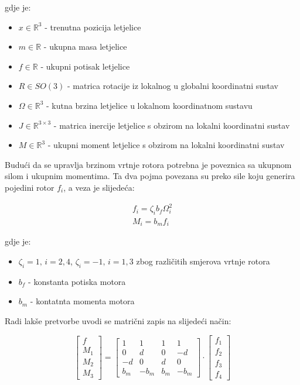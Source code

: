 \documentclass[times, utf8, diplomski]{fer}
\begin{document}
gdje je:
\begin{itemize}
	\item $x \in \mathbb{R}^3$ - trenutna pozicija letjelice
	
	\item $m \in \mathbb{R}$ - ukupna masa letjelice
	
	\item $f \in \mathbb{R}$ - ukupni potisak letjelice 
	
	\item $R \in SO(3)$ - matrica rotacije iz lokalnog u globalni koordinatni sustav
	
	\item $\Omega \in \mathbb{R}^3$ - kutna brzina letjelice u lokalnom koordinatnom sustavu
	
	\item $J \in \mathbb{R}^{3\times3}$ - matrica inercije letjelice s obzirom na lokalni koordinatni sustav
	
	\item $M \in \mathbb{R}^3$ - ukupni moment letjelice s obzirom na lokalni koordinatni sustav
\end{itemize}

\noindent Budući da se upravlja brzinom vrtnje rotora potrebna je poveznica sa ukupnom silom i ukupnim momentima. Ta dva pojma povezana su preko sile koju generira pojedini rotor $f_i$, a veza je slijedeća:

\begin{gather}
	f_i = \zeta_i b_f \Omega_{i}^2 \\
	M_i = b_m f_i
\end{gather}

gdje je:
\begin{itemize}
	\item $\zeta_i = 1,\, i = 2, 4$, $\zeta_i = -1,\, i=1,3$ zbog različitih smjerova vrtnje rotora
	\item $b_f$ - konstanta potiska motora
	\item $b_m$ - kontatnta momenta motora
\end{itemize}

\newpage
\clearpage

Radi lakše pretvorbe uvodi se matrični zapis na slijedeći način: 

\begin{equation}
	\begin{bmatrix}
		f \\
		M_1 \\
		M_2 \\
		M_3 
	\end{bmatrix} 
	=
	\begin{bmatrix}
		1	&	1	&	1	&	1 \\
		0	&	d	&	0	&	-d \\
		-d 	&	0	&	d	&	0 \\
		b_m &	-b_m	& 	b_m	& -b_m
	\end{bmatrix}
	\cdot
	\begin{bmatrix}
		f_1 \\
		f_2 \\
		f_3 \\
		f_4
	\end{bmatrix}
\end{equation}
\end{document}
